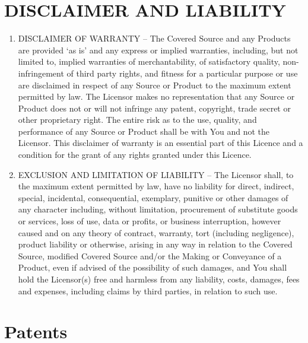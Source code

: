\documentclass[10pt, a4paper]{article}
\begin{document}
\section{DISCLAIMER AND LIABILITY}
\label{sec:warranty}
\begin{enumerate}[label=\ref*{sec:warranty}.\arabic*]
\item
DISCLAIMER OF WARRANTY – The Covered Source and any Products are provided `as is' and any express or implied warranties, including, but not limited to, implied warranties of merchantability, of satisfactory quality, non-infringement of third party rights, and fitness for a particular purpose or use are disclaimed in respect of any Source or Product to the maximum extent permitted by law. The Licensor makes no representation that any Source or Product does not or will not infringe any patent, copyright, trade secret or other proprietary right. The entire risk as to the use, quality, and performance of any Source or Product shall be with You and not the Licensor. This disclaimer of warranty is an essential part of this Licence and a condition for the grant of any rights granted under this Licence.
\item
EXCLUSION AND LIMITATION OF LIABILITY – The Licensor shall, to the maximum extent permitted by law, have no liability for direct, indirect, special, incidental, consequential, exemplary, punitive or other damages of any character including, without limitation, procurement of substitute goods or services, loss of use, data or profits, or business interruption, however caused and on any theory of contract, warranty, tort (including negligence), product liability or otherwise, arising in any way in relation to the Covered Source, modified Covered Source and/or the Making or Conveyance of a Product, even if advised of the possibility of such damages, and You shall hold the Licensor(s) free and harmless from any liability, costs, damages, fees and expenses, including claims by third parties, in relation to such use. 
\end{enumerate}

\section{Patents}
\label{sec:patents}
\end{document}
